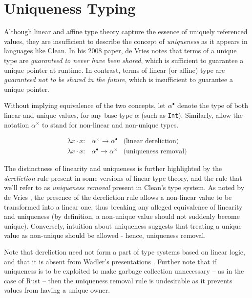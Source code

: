 \documentclass[]{unswthesis}
\begin{document}
\section{Uniqueness Typing}

Although linear and affine type theory capture the essence of uniquely referenced values, they are insufficient to describe the concept of \textit{uniqueness} as it appears in languages like Clean. In his 2008 paper, de Vries \cite{deVries08} notes that terms of a unique type are \textit{guaranteed to never have been shared}, which is sufficient to guarantee a unique pointer at runtime. In contrast, terms of linear (or affine) type are \textit{guaranteed not to be shared in the future}, which is insufficient to guarantee a unique pointer.

Without implying equivalence of the two concepts, let $\alpha^\bullet$ denote the type of both linear and unique values, for any base type $\alpha$ (such as \texttt{Int}). Similarly, allow the notation $\alpha^\times$ to stand for non-linear and non-unique types.

\begin{eqnarray*}
\lambda x \cdot x : & \alpha^\times \rightarrow \alpha^\bullet & \text{(linear dereliction)}\\
\lambda x \cdot x : & \alpha^\bullet \rightarrow \alpha^\times & \text{(uniqueness removal)}
\end{eqnarray*}

The distinctness of linearity and uniqueness is further highlighted by the \textit{dereliction} rule present in some versions of linear type theory, and the rule that we'll refer to as \textit{uniqueness removal} present in Clean's type system. As noted by de Vries \cite{deVriesPhD08}, the presence of the dereliction rule allows a non-linear value to be transformed into a linear one, thus breaking any alleged equivalence of linearity and uniqueness (by definition, a non-unique value should not suddenly become unique). Conversely, intuition about uniqueness suggests that treating a unique value as non-unique should be allowed - hence, uniqueness removal.

Note that dereliction need not form a part of type systems based on linear logic, and that it is absent from Wadler's presentations \cite{wadler90, wadler93}. Further note that if uniqueness is to be exploited to make garbage collection unnecessary -- as in the case of Rust -- then the uniqueness removal rule is undesirable as it prevents values from having a unique owner.
\end{document}
